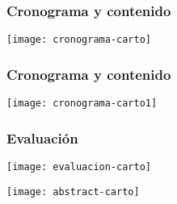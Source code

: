 \documentclass[12pt]{beamer}
\begin{document}
\begin{frame}
\frametitle{Cronograma y contenido}
\centering
\texttt{[image: cronograma-carto]}
\end{frame}
\begin{frame}
\frametitle{Cronograma y contenido}
\centering
\texttt{[image: cronograma-carto1]}
\end{frame}
\begin{frame}
\frametitle{Evaluación}
\centering
\texttt{[image: evaluacion-carto]}
\end{frame}
\begin{frame}
\centering
\texttt{[image: abstract-carto]}
\end{frame}
\end{document}
